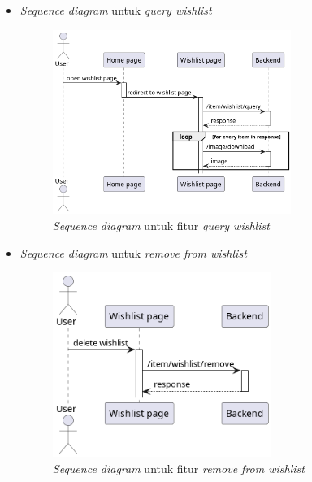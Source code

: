 \documentclass[a4paper]{article}
\begin{document}
\begin{enumerate}
\begin{enumerate}
\begin{itemize}
            \newpage
            \item \textit{Sequence diagram} untuk \textit{query wishlist}
            \begin{figure}[h]
                \centering
                \includegraphics*[height=6cm]{diagram/sequence diagram/FE/12. wishlist/query wishlist/query wishlist.png}
                \caption{\textit{Sequence diagram} untuk fitur \textit{query wishlist}}
            \end{figure}

            \item \textit{Sequence diagram} untuk \textit{remove from wishlist}
            \begin{figure}[h]
                \centering
                \includegraphics*[height=6cm]{diagram/sequence diagram/FE/12. wishlist/remove from wishlist/remove from wishlist.png}
                \caption{\textit{Sequence diagram} untuk fitur \textit{remove from wishlist}}
            \end{figure}


\end{itemize}
\end{enumerate}
\end{enumerate}
\end{document}
